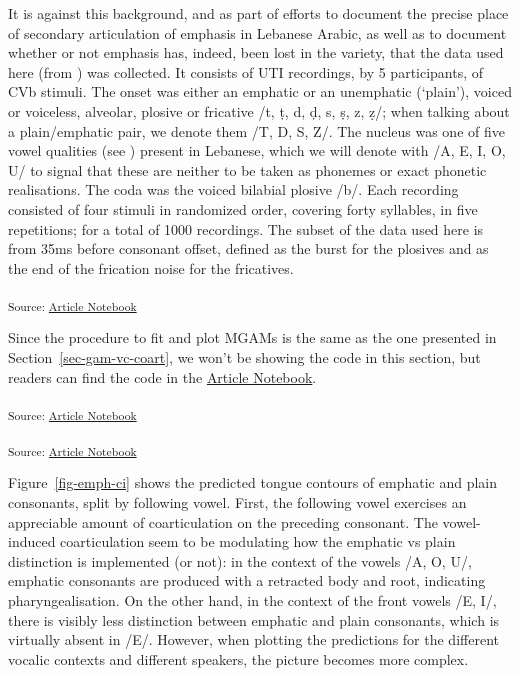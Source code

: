 \documentclass[
  man,
  longtable,
  nolmodern,
  notxfonts,
  notimes,
  colorlinks=true,linkcolor=blue,citecolor=blue,urlcolor=blue]{apa7}
\begin{document}
It is against this background, and as part of efforts to document the
precise place of secondary articulation of emphasis in Lebanese Arabic,
as well as to document whether or not emphasis has, indeed, been lost in
the variety, that the data used here (from ) was collected. It consists of UTI recordings, by 5 participants,
of CVb stimuli. The onset was either an emphatic or an unemphatic
(`plain'), voiced or voiceless, alveolar, plosive or fricative /t, ṭ, d,
ḍ, s, ṣ, z, ẓ/; when talking about a plain/emphatic pair, we denote them
/T, D, S, Z/. The nucleus was one of five vowel qualities (see
) present in Lebanese, which we will
denote with /A, E, I, O, U/ to signal that these are neither to be taken
as phonemes or exact phonetic realisations. The coda was the voiced
bilabial plosive /b/. Each recording consisted of four stimuli in
randomized order, covering forty syllables, in five repetitions; for a
total of 1000 recordings. The subset of the data used here is from 35ms
before consonant offset, defined as the burst for the plosives and as
the end of the frication noise for the fricatives.

\textsubscript{Source:
\href{https://stefanocoretta.github.io/mv_uti/index.qmd.html}{Article
Notebook}}

Since the procedure to fit and plot MGAMs is the same as the one
presented in Section~\ref{sec-gam-vc-coart}, we won't be showing the
code in this section, but readers can find the code in the
\href{index.qmd}{Article Notebook}.

\textsubscript{Source:
\href{https://stefanocoretta.github.io/mv_uti/index.qmd.html}{Article
Notebook}}

\textsubscript{Source:
\href{https://stefanocoretta.github.io/mv_uti/index.qmd.html}{Article
Notebook}}

Figure~\ref{fig-emph-ci} shows the predicted tongue contours of emphatic
and plain consonants, split by following vowel. First, the following
vowel exercises an appreciable amount of coarticulation on the preceding
consonant. The vowel-induced coarticulation seem to be modulating how
the emphatic vs plain distinction is implemented (or not): in the
context of the vowels /A, O, U/, emphatic consonants are produced with a
retracted body and root, indicating pharyngealisation. On the other
hand, in the context of the front vowels /E, I/, there is visibly less
distinction between emphatic and plain consonants, which is virtually
absent in /E/. However, when plotting the predictions for the different
vocalic contexts and different speakers, the picture becomes more
complex.
\end{document}
